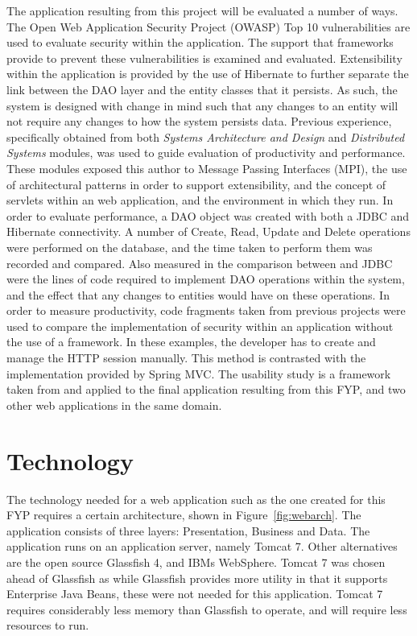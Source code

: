 The application resulting from this project will be evaluated a number of ways. The Open Web Application Security Project (OWASP) Top 10 vulnerabilities \parencite{owasp2013} are used to evaluate security within the application. The support that frameworks provide to prevent these vulnerabilities is examined and evaluated. Extensibility within the application is provided by the use of Hibernate to further separate the link between the DAO layer and the entity classes that it persists. As such, the system is designed with change in mind such that any changes to an entity will not require any changes to how the system persists data. Previous experience, specifically obtained from both \textit{Systems Architecture and Design} and \textit{Distributed Systems} modules, was used to guide evaluation of productivity and performance. These modules exposed this author to Message Passing Interfaces (MPI), the use of architectural patterns in order to support extensibility, and the concept of servlets within an web application, and the environment in which they run. In order to evaluate performance, a DAO object was created with both a JDBC and Hibernate connectivity. A number of Create, Read, Update and Delete operations were performed on the database, and the time taken to perform them was recorded and compared. Also measured in the comparison between  and JDBC were the lines of code required to implement DAO operations within the system, and the effect that any changes to entities would have on these operations. In order to measure productivity, code fragments taken from previous projects were used to compare the implementation of security within an application without the use of a framework. In these examples, the developer has to create and manage the HTTP session manually. This method is contrasted with the implementation provided by Spring MVC. The usability study is a framework taken from \parencite{holzinger2005usability} and applied to the final application resulting from this FYP, and two other web applications in the same domain. 

\section{Technology}

The technology needed for a web application such as the one created for this FYP requires a certain architecture, shown in Figure~\ref{fig:webarch}. The application consists of three layers: Presentation, Business and Data. The application runs on an application server, namely Tomcat 7. Other alternatives are the open source Glassfish 4, and IBMs WebSphere. Tomcat 7 was chosen ahead of Glassfish as while Glassfish provides more utility in that it supports Enterprise Java Beans, these were not needed for this application. Tomcat 7 requires considerably less memory than Glassfish to operate, and will require less resources to run. 

